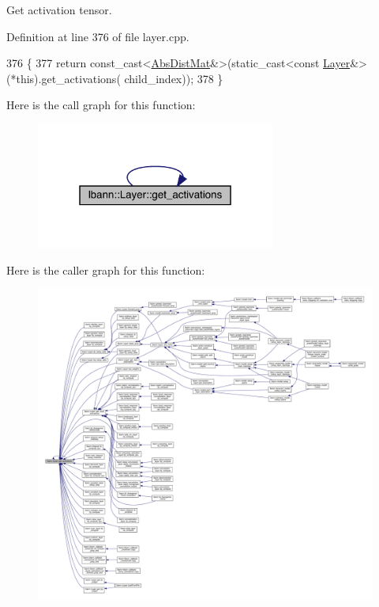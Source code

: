 Get activation tensor. 

Definition at line 376 of file layer.\+cpp.


\begin{DoxyCode}
376                                                   \{
377   \textcolor{keywordflow}{return} \textcolor{keyword}{const\_cast<}\hyperlink{base_8hpp_a9a697a504ae84010e7439ffec862b470}{AbsDistMat}&\textcolor{keyword}{>}(\textcolor{keyword}{static\_cast<}\textcolor{keyword}{const }\hyperlink{classlbann_1_1Layer_a24e9c82354a0a2af1b70cbca2211e7d4}{Layer}&\textcolor{keyword}{>}(*this).get\_activations(
      child\_index));
378 \}
\end{DoxyCode}
Here is the call graph for this function\+:\nopagebreak
\begin{figure}[H]
\begin{center}
\leavevmode
\includegraphics[width=223pt]{classlbann_1_1Layer_a1134b1a4385af199d7272c5aa827fa99_cgraph}
\end{center}
\end{figure}
Here is the caller graph for this function\+:\nopagebreak
\begin{figure}[H]
\begin{center}
\leavevmode
\includegraphics[width=350pt]{classlbann_1_1Layer_a1134b1a4385af199d7272c5aa827fa99_icgraph}
\end{center}
\end{figure}
\mbox{\label{classlbann_1_1Layer_af69a4773804c6982e8acaf5810eaa150}} 
